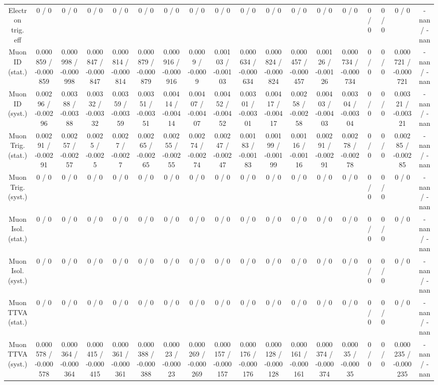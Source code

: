\documentclass[10pt]{article}
\begin{document}
\begin{table}[htbp]
\begin{center}
\begin{tabular}{|c|c|c|c|c|c|c|c|c|c|c|c|c|c|c|c|c|c|}
  Electron trig. eff & 0 / 0 & 0 / 0 & 0 / 0 & 0 / 0 & 0 / 0 & 0 / 0 & 0 / 0 & 0 / 0 & 0 / 0 & 0 / 0 & 0 / 0 & 0 / 0 & 0 / 0 & 0 / 0 & 0 / 0 & 0 / 0 & -nan / -nan \\ 
  Muon ID (stat.) & 0.000859 / -0.000859 & 0.000998 / -0.000998 & 0.000847 / -0.000847 & 0.000814 / -0.000814 & 0.000879 / -0.000879 & 0.000916 / -0.000916 & 0.0009 / -0.0009 & 0.00103 / -0.00103 & 0.000634 / -0.000634 & 0.000824 / -0.000824 & 0.000457 / -0.000457 & 0.00126 / -0.00126 & 0.000734 / -0.000734 & 0 / 0 & 0 / 0 & 0.000721 / -0.000721 & -nan / -nan \\ 
  Muon ID (syst.) & 0.00296 / -0.00296 & 0.00388 / -0.00388 & 0.00332 / -0.00332 & 0.00359 / -0.00359 & 0.00351 / -0.00351 & 0.00414 / -0.00414 & 0.00407 / -0.00407 & 0.00452 / -0.00452 & 0.00301 / -0.00301 & 0.00417 / -0.00417 & 0.00258 / -0.00258 & 0.00403 / -0.00403 & 0.00304 / -0.00304 & 0 / 0 & 0 / 0 & 0.00321 / -0.00321 & -nan / -nan \\ 
  Muon Trig. (stat.) & 0.00291 / -0.00291 & 0.00257 / -0.00257 & 0.0025 / -0.0025 & 0.0027 / -0.0027 & 0.00265 / -0.00265 & 0.00255 / -0.00255 & 0.00274 / -0.00274 & 0.00247 / -0.00247 & 0.00183 / -0.00183 & 0.00199 / -0.00199 & 0.00116 / -0.00116 & 0.00291 / -0.00291 & 0.00278 / -0.00278 & 0 / 0 & 0 / 0 & 0.00285 / -0.00285 & -nan / -nan \\ 
  Muon Trig. (syst.) & 0 / 0 & 0 / 0 & 0 / 0 & 0 / 0 & 0 / 0 & 0 / 0 & 0 / 0 & 0 / 0 & 0 / 0 & 0 / 0 & 0 / 0 & 0 / 0 & 0 / 0 & 0 / 0 & 0 / 0 & 0 / 0 & -nan / -nan \\ 
  Muon Isol. (stat.) & 0 / 0 & 0 / 0 & 0 / 0 & 0 / 0 & 0 / 0 & 0 / 0 & 0 / 0 & 0 / 0 & 0 / 0 & 0 / 0 & 0 / 0 & 0 / 0 & 0 / 0 & 0 / 0 & 0 / 0 & 0 / 0 & -nan / -nan \\ 
  Muon Isol. (syst.) & 0 / 0 & 0 / 0 & 0 / 0 & 0 / 0 & 0 / 0 & 0 / 0 & 0 / 0 & 0 / 0 & 0 / 0 & 0 / 0 & 0 / 0 & 0 / 0 & 0 / 0 & 0 / 0 & 0 / 0 & 0 / 0 & -nan / -nan \\ 
  Muon TTVA (stat.) & 0 / 0 & 0 / 0 & 0 / 0 & 0 / 0 & 0 / 0 & 0 / 0 & 0 / 0 & 0 / 0 & 0 / 0 & 0 / 0 & 0 / 0 & 0 / 0 & 0 / 0 & 0 / 0 & 0 / 0 & 0 / 0 & -nan / -nan \\ 
  Muon TTVA (syst.) & 0.000578 / -0.000578 & 0.000364 / -0.000364 & 0.000415 / -0.000415 & 0.000361 / -0.000361 & 0.000388 / -0.000388 & 0.00023 / -0.00023 & 0.000269 / -0.000269 & 0.000157 / -0.000157 & 0.000176 / -0.000176 & 0.000128 / -0.000128 & 0.000161 / -0.000161 & 0.000374 / -0.000374 & 0.00035 / -0.00035 & 0 / 0 & 0 / 0 & 0.000235 / -0.000235 & -nan / -nan \\ 

\end{tabular}
\end{center}
\end{table}
\end{document}
